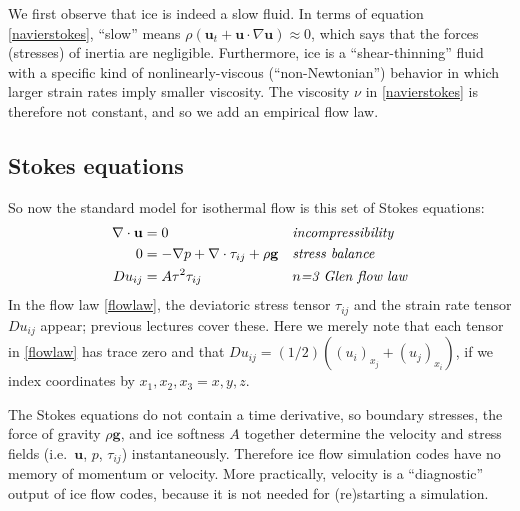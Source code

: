 \documentclass[letterpaper,final,12pt,reqno]{amsart}
\newcommand{\bu}{\mathbf{u}}
\begin{document}
We first observe that ice is indeed a slow fluid.  In terms of equation \eqref{navierstokes}, ``slow'' means $\rho \left(\mathbf{u}_t + \mathbf{u}\cdot\nabla \mathbf{u}\right) \approx 0$, which says that the forces (stresses) of inertia are negligible.  Furthermore, ice is a ``shear-thinning'' fluid with a specific kind of nonlinearly-viscous (``non-Newtonian'') behavior in which larger strain rates imply smaller viscosity.  The viscosity $\nu$ in \eqref{navierstokes} is therefore not constant, and so we add an empirical flow law.

\subsection*{Stokes equations}  So now the standard model for isothermal flow is this set of Stokes equations:
\begin{align}
\nabla \cdot \mathbf{u} &= 0 &&\text{\emph{incompressibility}} \label{incompressibleagain} \\
0 &= - \nabla p + \nabla \cdot \tau_{ij} + \rho \mathbf{g} &&\text{\emph{stress balance}} \label{forcebalance} \\
Du_{ij} &= A \tau^2 \tau_{ij} &&\text{\emph{$n$=3 Glen flow law}} \label{flowlaw}
\end{align}
In the flow law \eqref{flowlaw}, the deviatoric stress tensor $\tau_{ij}$ and the strain rate tensor $Du_{ij}$ appear; previous lectures cover these.  Here we merely note that each tensor in \eqref{flowlaw} has trace zero and that $Du_{ij} = (1/2)((u_i)_{x_j}+(u_j)_{x_i})$, if we index coordinates by $x_1,x_2,x_3=x,y,z$.

The Stokes equations do not contain a time derivative, so boundary stresses, the force of gravity $\rho \mathbf{g}$, and ice softness $A$ together determine the velocity and stress fields (i.e.~$\bu$, $p$, $\tau_{ij}$) instantaneously.  Therefore ice flow simulation codes have no memory of momentum or velocity.  More practically, velocity is a ``diagnostic'' output of ice flow codes, because it is not needed for (re)starting a simulation.
\end{document}
